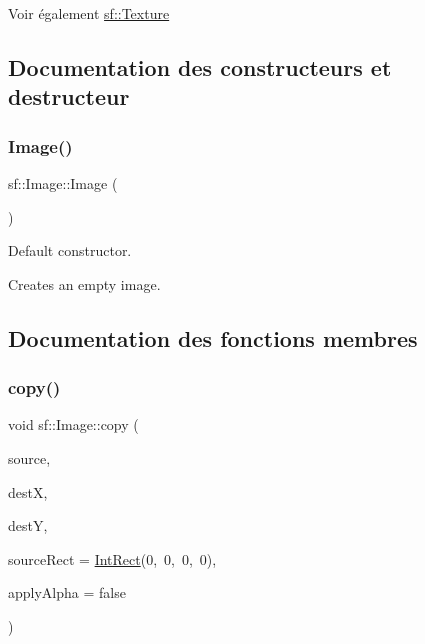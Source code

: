 \begin{DoxySeeAlso}{Voir également}
\hyperlink{classsf_1_1Texture}{sf\+::\+Texture} 
\end{DoxySeeAlso}


\subsection{Documentation des constructeurs et destructeur}
\mbox{\label{classsf_1_1Image_abb4caf3cb167b613345ebe36fc883f12}} 
\subsubsection{\texorpdfstring{Image()}{Image()}}
{\footnotesize\ttfamily sf\+::\+Image\+::\+Image (\begin{DoxyParamCaption}{ }\end{DoxyParamCaption})}



Default constructor. 

Creates an empty image. 

\subsection{Documentation des fonctions membres}
\mbox{\label{classsf_1_1Image_ab2fa337c956f85f93377dcb52153a45a}} 
\subsubsection{\texorpdfstring{copy()}{copy()}}
{\footnotesize\ttfamily void sf\+::\+Image\+::copy (\begin{DoxyParamCaption}\item[{const \hyperlink{classsf_1_1Image}{Image} \&}]{source,  }\item[{unsigned int}]{destX,  }\item[{unsigned int}]{destY,  }\item[{const \hyperlink{classsf_1_1Rect}{Int\+Rect} \&}]{source\+Rect = {\ttfamily \hyperlink{classsf_1_1Rect}{Int\+Rect}(0,~0,~0,~0)},  }\item[{bool}]{apply\+Alpha = {\ttfamily false} }\end{DoxyParamCaption})}



